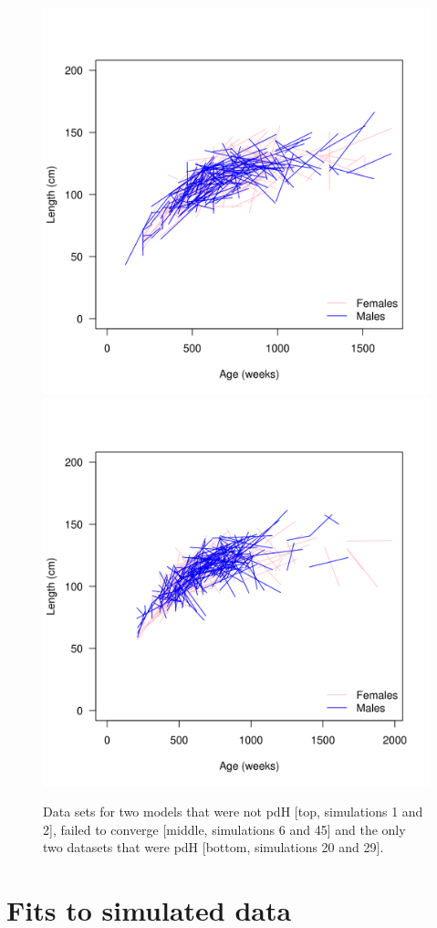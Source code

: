 \documentclass[11pt, a4paper]{article}
\begin{document}
\begin{figure}[!htbp]
  \includegraphics[width=0.49\linewidth]{../simulation/sims/growth-20.png}
  \includegraphics[width=0.49\linewidth]{../simulation/sims/growth-29.png}
  \begin{quote}
    \caption{Data sets for two models that were not pdH [top, simulations 1 and
      2], failed to converge [middle, simulations 6 and 45] and the only two
      datasets that were pdH [bottom, simulations 20 and 29].}
  \label{fig:1}
  \end{quote}
\end{figure}

\section{Fits to simulated data}





%
%
\end{document}
